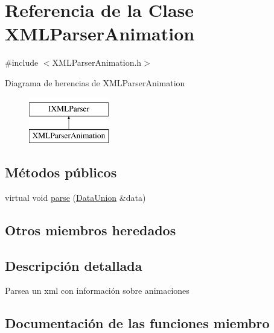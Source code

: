 \hypertarget{classXMLParserAnimation}{}\section{Referencia de la Clase X\+M\+L\+Parser\+Animation}
\label{classXMLParserAnimation}


{\ttfamily \#include $<$X\+M\+L\+Parser\+Animation.\+h$>$}

Diagrama de herencias de X\+M\+L\+Parser\+Animation\begin{figure}[H]
\begin{center}
\leavevmode
\includegraphics[height=2.000000cm]{classXMLParserAnimation}
\end{center}
\end{figure}
\subsection*{Métodos públicos}
\begin{DoxyCompactItemize}
\item 
virtual void \hyperlink{classXMLParserAnimation_a9b10d45d037d28b4c4849ef3217a7603}{parse} (\hyperlink{unionDataUnion}{Data\+Union} \&data)
\end{DoxyCompactItemize}
\subsection*{Otros miembros heredados}


\subsection{Descripción detallada}
Parsea un xml con información sobre animaciones 

\subsection{Documentación de las funciones miembro}
\hypertarget{classXMLParserAnimation_a9b10d45d037d28b4c4849ef3217a7603}{}
